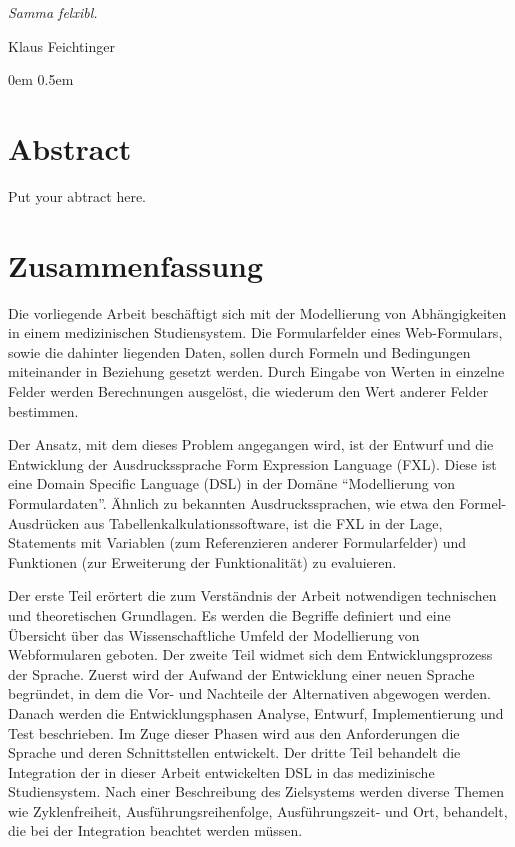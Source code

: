 \documentclass [11pt,smallheadings, a4paper]{report}
\begin{document}
\newenvironment{myquote}%
{\begin{quote}\small}%
{\end{quote}}%


\noindent
\emph{Samma felxibl.}
\begin{flushright}
Klaus Feichtinger
\end{flushright}
\pagestyle{headings}
\tableofcontents


\pagestyle{headings}


\parindent0em
\parskip0.5em

\renewcommand{\baselinestretch}{1.0}\normalsize

\chapter*{Abstract}
Put your abtract here.

\chapter*{Zusammenfassung}
Die vorliegende Arbeit beschäftigt sich mit der Modellierung von Ab\-hän\-gig\-kei\-ten in einem medizinischen Studiensystem. Die Formularfelder eines Web-Formulars, sowie die dahinter liegenden Daten, sollen durch Formeln und Bedingungen miteinander in Beziehung gesetzt werden. Durch Eingabe von Werten in einzelne Felder werden Berechnungen ausgelöst, die wiederum den Wert anderer Felder bestimmen.

Der Ansatz, mit dem dieses Problem angegangen wird, ist der Entwurf und die Entwicklung der Ausdruckssprache Form Expression Language (FXL). Diese ist eine Domain Specific Language (DSL) in der Domäne ``Modellierung von Formulardaten''. Ähnlich zu bekannten Ausdruckssprachen, wie etwa den Formel-Ausdrücken aus Tabellenkalkulationssoftware, ist die FXL in der Lage, Statements mit Variablen (zum Referenzieren anderer Formularfelder) und Funktionen (zur Erweiterung der Funktionalität) zu evaluieren.

Der erste Teil erörtert die zum Verständnis der Arbeit notwendigen technischen und theoretischen Grundlagen. Es werden die Begriffe definiert und eine Über\-sicht über das Wissenschaftliche Umfeld der Modellierung von Webformularen geboten.
Der zweite Teil widmet sich dem Entwicklungsprozess der Sprache. Zuerst wird der Aufwand der Entwicklung einer neuen Sprache begründet, in dem die Vor- und Nachteile der Alternativen abgewogen werden. Danach werden die Entwicklungsphasen Analyse, Entwurf, Implementierung und Test beschrieben. Im Zuge dieser Phasen wird aus den Anforderungen die Sprache und deren Schnittstellen entwickelt.
Der dritte Teil behandelt die Integration der in dieser Arbeit entwickelten DSL in das medizinische Studiensystem. Nach einer Beschreibung des Zielsystems werden diverse Themen wie Zyklenfreiheit, Ausführungsreihenfolge, Ausführungszeit- und Ort, behandelt, die bei der Integration beachtet werden müssen.
\end{document}
